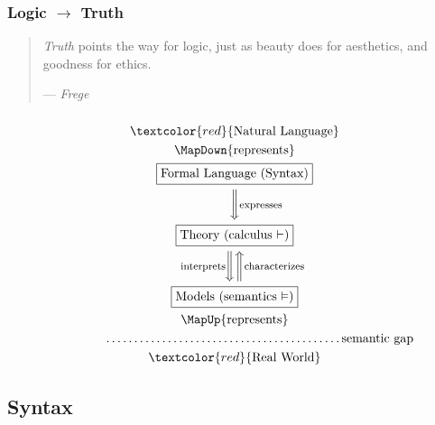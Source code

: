 \documentclass[UTF8,aspectratio=43,11pt,colorlinks,compress,openany]{beamer}%
\begin{document}
\begin{frame}\frametitle{Logic $\to$ Truth}
	\begin{quote}
		\emph{Truth} points the way for logic, just as beauty does for aesthetics, and goodness for ethics.\par
		\hfill --- \textsl{Frege}
	\end{quote}
	\centerline{}
\end{frame}

\begin{frame}\frametitle{}
\begin{gather*}
\textcolor{red}{{\text{Natural Language}}}\\
\MapDown{\text{represents}}\\
\fbox{Formal Language (Syntax)}\\
\bigg{\Downarrow}\rlap{\text{\footnotesize expresses}}\\
\fbox{Theory (calculus $\vdash$)}\\
\bigg{\Downarrow}\llap{\text{\footnotesize interprets\;\;\;}}\bigg{\Uparrow}\rlap{\text{\footnotesize characterizes}}\\
\fbox{Models (semantics $\vDash$)}\\
\MapUp{\text{represents}}\\
\qquad\qquad\dots\dots\dots\dots\dots\dots\dots\dots\dots\dots\dots\dots\dots\dots \text{semantic gap}\\
\textcolor{red}{{\text{Real World}}}
\end{gather*}
\end{frame}

\subsection{Syntax}
\end{document}
